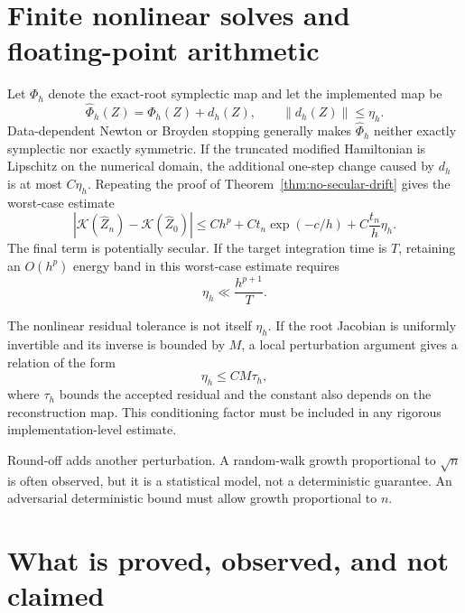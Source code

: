 \documentclass[11pt,a4paper]{article}
\theoremstyle{definition}
\theoremstyle{remark}
\newcommand{\K}{\mathcal{K}}
\newcommand{\PhiNum}{\Phi_h}
\newcommand{\norm}[1]{\left\lVert #1\right\rVert}
\newcommand{\abs}[1]{\left\lvert #1\right\rvert}
\begin{document}
\section{Finite nonlinear solves and floating-point arithmetic}

Let $\PhiNum$ denote the exact-root symplectic map and let the implemented map
be
\begin{equation}
 \widehat\Phi_h(Z)=\PhiNum(Z)+d_h(Z),
 \qquad
 \norm{d_h(Z)}\leq\eta_h.
 \label{eq:perturbed-map}
\end{equation}
Data-dependent Newton or Broyden stopping generally makes
$\widehat\Phi_h$ neither exactly symplectic nor exactly symmetric.  If the
truncated modified Hamiltonian is Lipschitz on the numerical domain, the
additional one-step change caused by $d_h$ is at most $C\eta_h$.  Repeating the
proof of Theorem~\ref{thm:no-secular-drift} gives the worst-case estimate
\begin{equation}
 \abs{\K(\widehat Z_n)-\K(\widehat Z_0)}
 \leq Ch^p+C t_n\exp(-c/h)
       +C\frac{t_n}{h}\eta_h.
 \label{eq:finite-solve-energy-bound}
\end{equation}
The final term is potentially secular.  If the target integration time is
$T$, retaining an $O(h^p)$ energy band in this worst-case estimate requires
\begin{equation}
 \eta_h\ll\frac{h^{p+1}}{T}.
 \label{eq:map-error-requirement}
\end{equation}

The nonlinear residual tolerance is not itself $\eta_h$.  If the root
Jacobian is uniformly invertible and its inverse is bounded by $M$, a local
perturbation argument gives a relation of the form
\begin{equation}
 \eta_h\leq C M\tau_h,
 \label{eq:residual-to-map-error}
\end{equation}
where $\tau_h$ bounds the accepted residual and the constant also depends on
the reconstruction map.  This conditioning factor must be included in any
rigorous implementation-level estimate.

Round-off adds another perturbation.  A random-walk growth proportional to
$\sqrt{n}$ is often observed, but it is a statistical model, not a deterministic
guarantee.  An adversarial deterministic bound must allow growth proportional
to $n$.

\section{What is proved, observed, and not claimed}
\end{document}
